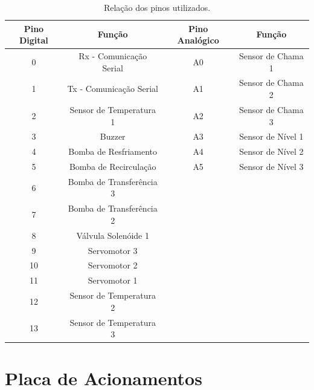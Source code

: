 \begin{table}[]
\caption{Relação dos pinos utilizados.}
\label{Pinagem}
\begin{tabular}{cccc}
\hline
\textbf{Pino Digital} & \textbf{Função}          & \textbf{Pino Analógico} & \textbf{Função}   \\ \hline
0                     & Rx - Comunicação Serial    & A0                      & Sensor de Chama 1 \\ \hline
1                     & Tx - Comunicação Serial  	 & A1                      & Sensor de Chama 2 \\ \hline
2                     & Sensor de Temperatura 1  & A2                      & Sensor de Chama 3 \\ \hline
3                     & Buzzer                  		 & A3                      & Sensor de Nível 1 \\ \hline
4                     & Bomba de Resfriamento     & A4                      & Sensor de Nível 2 \\ \hline
5                     & Bomba de Recirculação      & A5                      & Sensor de Nível 3 \\ \hline
6                     & Bomba de Transferência 3 &                         &                   \\ \hline
7                     & Bomba de Transferência 2 &                         &                   \\ \hline
8                     & Válvula Solenóide 1           &                         &                   \\ \hline
9                     & Servomotor 3             	&                         &                   \\ \hline
10                    & Servomotor 2             	&                         &                   \\ \hline
11                    & Servomotor 1             	&                         &                   \\ \hline
12                    & Sensor de Temperatura 2  &                         &                   \\ \hline
13                    & Sensor de Temperatura 3  &                         &                   \\ \hline
\end{tabular}
\end{table}

		\section{Placa de Acionamentos}

